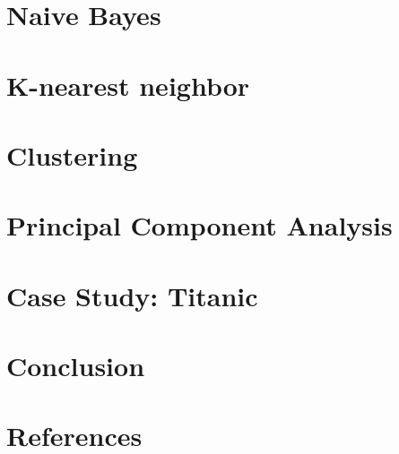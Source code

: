  \section[NB]{Naive Bayes}




 \section[Knn]{K-nearest neighbor}



 \section[Clust]{Clustering}





 \section[PCA]{Principal Component Analysis}



 \section[Case]{Case Study: Titanic}




 \section[End]{Conclusion}




 \section[Refs]{References}
